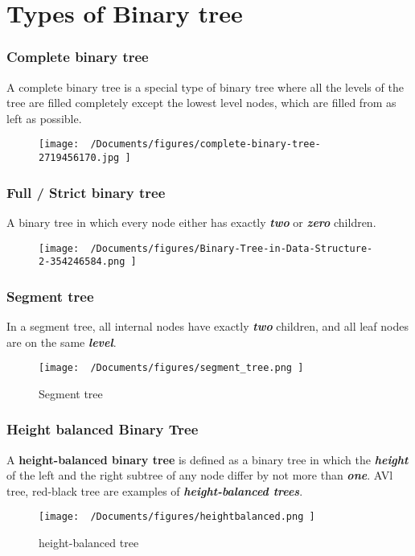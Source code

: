 \documentclass{report}
\begin{document}
\section{Types of Binary tree} \vspace{2mm}

\subsubsection{Complete binary tree}
A complete binary tree is a special type of binary tree where all the levels of the tree are filled completely except the lowest level nodes, which are filled from as left as possible.
\begin{figure}[ht]
\centering
\texttt{[image:  ~/Documents/figures/complete-binary-tree-2719456170.jpg ]}
\end{figure}
\subsubsection{Full / Strict binary tree}

A binary tree in which every node either has exactly \textit{\textbf{two}} or \textit{\textbf{zero}} children.
\begin{figure}[ht]
\centering
\texttt{[image:  ~/Documents/figures/Binary-Tree-in-Data-Structure-2-354246584.png ]}
\end{figure}
\newpage
\subsubsection{Segment tree}
In a segment tree, all internal nodes have exactly \textit{\textbf{two}} children, and all leaf nodes are on the same \textit{\textbf{level}}.
\begin{figure}[ht]
\centering
\texttt{[image:  ~/Documents/figures/segment\_tree.png ]}
\caption{Segment tree}
\end{figure}
\subsubsection{Height balanced Binary Tree}
A \textbf{height-balanced binary tree} is defined as a binary tree in which the \textit{\textbf{height}} of the left and the right subtree of any node differ by not more than \textit{\textbf{one}}.
\bigbreak \noindent
AVl tree, red-black tree are examples of \textit{\textbf{height-balanced trees}}.
\begin{figure}[ht]
\centering
\texttt{[image:  ~/Documents/figures/heightbalanced.png ]}
\caption{height-balanced tree}
\end{figure}
\end{document}
